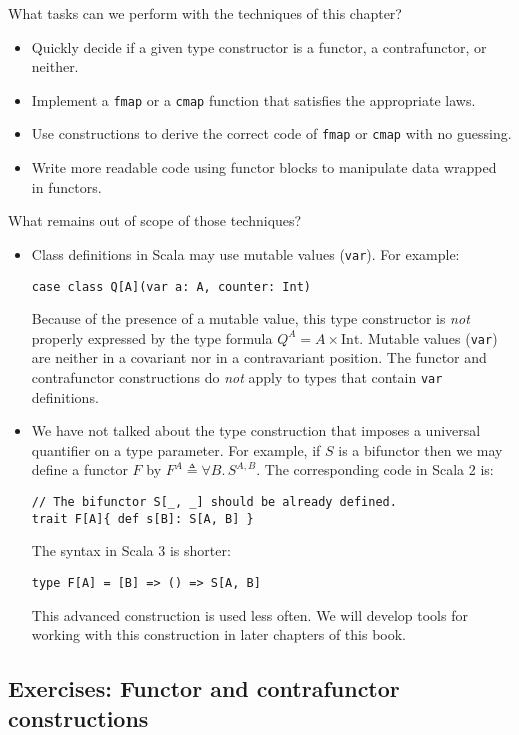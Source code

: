 What tasks can we perform with the techniques of this chapter?
\begin{itemize}
\item Quickly decide if a given type constructor is a functor, a contrafunctor,
or neither.
\item Implement a \lstinline!fmap! or a \lstinline!cmap! function that
satisfies the appropriate laws.
\item Use constructions to derive the correct code of \lstinline!fmap!
or \lstinline!cmap! with no guessing.
\item Write more readable code using functor blocks to manipulate data wrapped
in functors.
\end{itemize}
What remains out of scope of those techniques?
\begin{itemize}
\item Class definitions in Scala may use mutable values (\lstinline!var!).
For example:
\begin{lstlisting}
case class Q[A](var a: A, counter: Int)
\end{lstlisting}
Because of the presence of a mutable value,
this type constructor is \emph{not} properly expressed by the type
formula $Q^{A}=A\times\text{Int}$. Mutable values (\lstinline!var!)
are neither in a covariant nor in a contravariant position. The functor
and contrafunctor constructions do \emph{not} apply to types that
contain \lstinline!var! definitions.
\item We have not talked about the type construction that imposes a universal
quantifier
on a type parameter. For example, if $S$ is a bifunctor then we may
define a functor $F$ by $F^{A}\triangleq\forall B.\,S^{A,B}$. The
corresponding code in Scala 2 is:
\begin{lstlisting}
// The bifunctor S[_, _] should be already defined.
trait F[A]{ def s[B]: S[A, B] }
\end{lstlisting}
The syntax in Scala 3 is shorter:
\begin{lstlisting}
type F[A] = [B] => () => S[A, B]
\end{lstlisting}
This advanced construction is used less often. We will develop tools
for working with this construction in later chapters of this book.
\end{itemize}

\subsection{Exercises: Functor and contrafunctor constructions }

